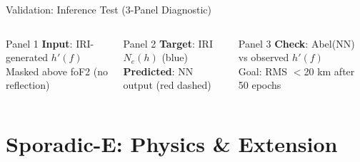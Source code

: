 \documentclass[aspectratio=169,10pt]{beamer}
\begin{document}
\begin{frame}{Validation: Inference Test (3-Panel Diagnostic)}
\vspace{2pt}
\begin{columns}
  \begin{block}{\scriptsize Panel 1}
    \scriptsize
    \textbf{Input}: IRI-generated $h'(f)$\\
    Masked above foF2 (no reflection)
  \end{block}
  \begin{block}{\scriptsize Panel 2}
    \scriptsize
    \textbf{Target}: IRI $N_e(h)$ (blue)\\
    \textbf{Predicted}: NN output (red dashed)
  \end{block}
  \begin{exampleblock}{\scriptsize Panel 3}
    \scriptsize
    \textbf{Check}: Abel(NN) vs observed $h'(f)$\\
    Goal: RMS $<$20 km after 50 epochs
  \end{exampleblock}
\end{columns}
\end{frame}

\section{Sporadic-E: Physics \& Extension}
\end{document}
